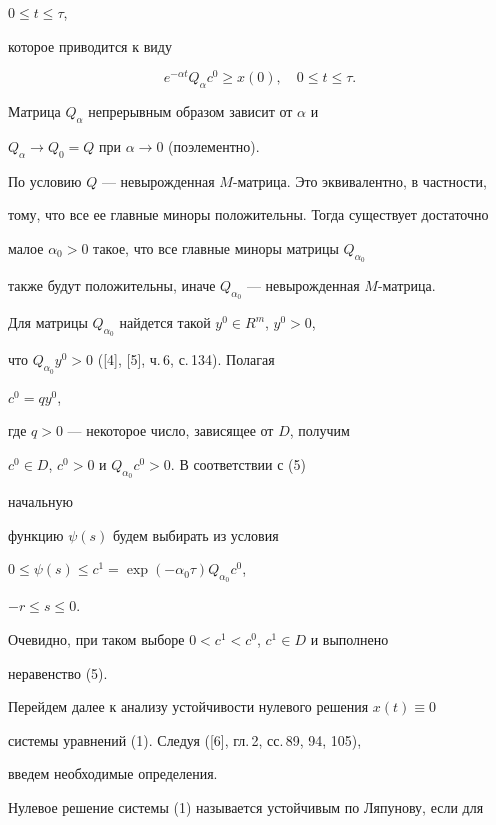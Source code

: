 \begin{pf}
$0 \le t \le \tau$,


которое приводится к виду


\begin{equation}


e^{-\alpha t} Q_\alpha c^0 \ge x(0), \quad 0 \le t \le \tau.


\end{equation}


Матрица $Q_\alpha$ непрерывным образом зависит от $\alpha$ и


$Q_\alpha \to Q_0 = Q$ при $\alpha \to 0$ (поэлементно).


По условию $Q$ --- невырожденная $M$-матрица. Это эквивалентно, в частности,


тому, что все ее главные миноры положительны. Тогда существует достаточно


малое $\alpha_0 > 0$ такое, что все главные миноры матрицы $Q_{\alpha_0}$


также будут положительны, иначе $Q_{\alpha_0}$ --- невырожденная $M$-матрица.


Для матрицы $Q_{\alpha_0}$ найдется такой $y^0 \in R^m$, $y^0 > 0$,


что $Q_{\alpha_0} y^0 > 0$ ([4], [5], ч.\,6, с.\,134). Полагая


$c^0 = qy^0$,


где $q > 0$ --- некоторое число, зависящее от $D$, получим


$c^0 \in D$, $c^0 > 0$ и $Q_{\alpha_0} c^0 > 0$. В соответствии с (5)


начальную


функцию $\psi (s)$ будем выбирать из условия


$0\le\psi(s)\le c^1=\exp(-\alpha_0 \tau)Q_{\alpha_0}c^0$,


$-r\le s \le 0$.


Очевидно, при таком выборе $0 < c^1 < c^0$, $c^1 \in D$ и выполнено


неравенство (5).


\end{pf}





Перейдем далее к анализу устойчивости нулевого решения $x(t) \equiv 0$


системы уравнений (1). Следуя ([6], гл.\,2, сс.\,89, 94, 105),


введем необходимые определения.


Нулевое решение системы (1) называется устойчивым по Ляпунову, если для


